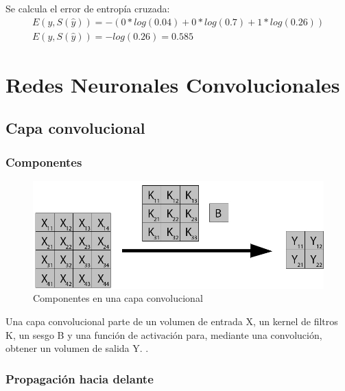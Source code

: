 Se calcula el error de entropía cruzada: \\

\begin{gather}
	 E(y, S(\hat{y})) = - (0*log(0.04) + 0*log(0.7) + 1*log(0.26)) \\
	 E(y, S(\hat{y})) = -log(0.26) = 0.585
\end{gather}

\cite{Cross_entropy_backprop}

\section{Redes Neuronales Convolucionales}

\subsection{Capa convolucional}

\subsubsection{Componentes}


\begin{figure}[H]
	\centering
	\includegraphics[scale=0.35]{imagenes/conv_nombres.jpg}  
	\caption{Componentes en una capa convolucional}
	\label{fig:Componentes_convolucion}
\end{figure}

Una capa convolucional parte de un volumen de entrada X, un kernel de filtros K, un sesgo B y una función de activación para, mediante una convolución, obtener un volumen de salida Y. \cite{capa_convolucional} \cite{capa_convolucional_Stanford}.

\subsubsection{Propagación hacia delante}

